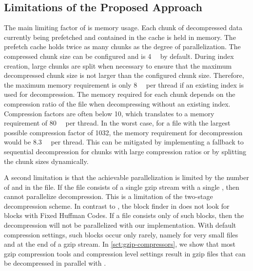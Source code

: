 \subsection{Limitations of the Proposed Approach}


The main limiting factor of \pragzipname is memory usage.
Each chunk of decompressed data currently being prefetched and contained in the cache is held in memory.
The prefetch cache holds twice as many chunks as the degree of parallelization.
The compressed chunk size can be configured and is \SI{4}{\mebi\byte} by default.
During index creation, large chunks are split when necessary to ensure that the maximum decompressed chunk size is not larger than the configured chunk size.
Therefore, the maximum memory requirement is only \SI{8}{\mebi\byte} per thread if an existing index is used for decompression.
The memory required for each chunk depends on the compression ratio of the file when decompressing without an existing index.
Compression factors are often below \num{10}, which translates to a memory requirement of \SI{80}{\mebi\byte} per thread.
In the worst case, for a file with the largest possible compression factor of \num{1032}, the memory requirement for decompression would be \SI{8.3}{\gibi\byte} per thread.
This can be mitigated by implementing a fallback to sequential decompression for chunks with large compression ratios or by splitting the chunk sizes dynamically.

A second limitation is that the achievable parallelization is limited by the number of \rawblocks and \dynblocks in the file.
If the file consists of a single gzip stream with a single , then \pragzipname cannot parallelize decompression.
This is a limitation of the two-stage decompression scheme.
In contrast to \pugz, the block finder in \pragzipname does not look for  blocks with Fixed Huffman Codes.
If a file consists only of such  blocks, then the decompression will not be parallelized with our implementation.
With default compression settings, such blocks occur only rarely, namely for very small files and at the end of a gzip stream.
In \cref{sct:gzip-compressors}, we show that most gzip compression tools and compression level settings result in gzip files that can be decompressed in parallel with \pragzipname.
